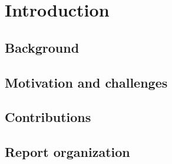 \chapter{Introduction}
\section{Background}
\section{Motivation and challenges}
\section{Contributions}
\section{Report organization}